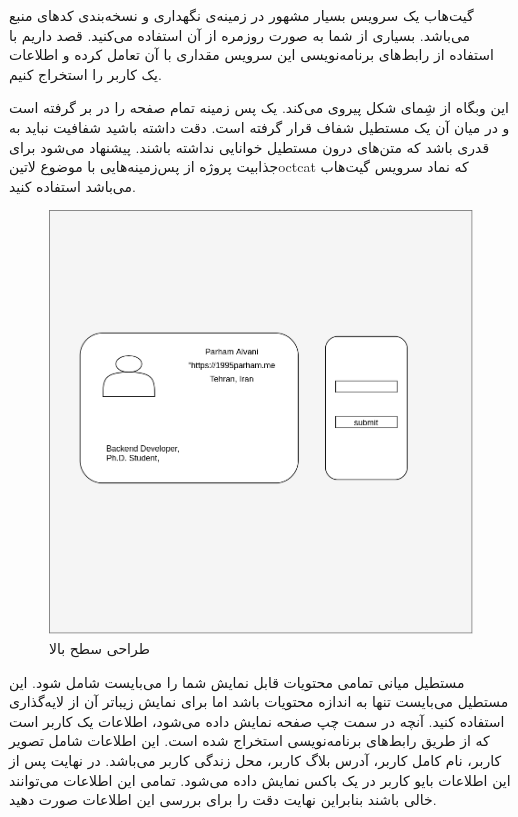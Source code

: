 \documentclass[../main.tex]{subfiles}
\begin{document}

گیت‌هاب یک سرویس بسیار مشهور در زمینه‌ی نگهداری و نسخه‌بندی کدهای منبع می‌باشد. بسیاری از شما به صورت روزمره از آن استفاده می‌کنید.
قصد داریم با استفاده از رابط‌های برنامه‌نویسی این سرویس مقداری با آن تعامل کرده و اطلاعات یک کاربر را استخراج کنیم.

این وبگاه از شِمای شکل  پیروی می‌کند. یک پس زمینه تمام صفحه را در بر گرفته است و در میان آن یک مستطیل شفاف قرار گرفته است.
دقت داشته باشید شفافیت نباید به قدری باشد که متن‌های درون مستطیل خوانایی نداشته باشند.
پیشنهاد می‌شود برای جذابیت پروژه از پس‌زمینه‌هایی با موضوع ‌لاتین{octcat} که نماد سرویس گیت‌هاب می‌باشد استفاده کنید.

\begin{figure}[h]
  \centering
  \includegraphics[scale=0.25]{./github}
  \caption{طراحی سطح بالا}
  \label{fig:high-level-design}
\end{figure}

مستطیل میانی تمامی محتویات قابل نمایش شما را می‌بایست شامل شود. این مستطیل می‌بایست تنها به اندازه محتویات باشد اما برای نمایش زیباتر آن از لایه‌گذاری استفاده کنید.
آنچه در سمت چپ صفحه نمایش داده می‌شود، اطلاعات یک کاربر است که از طریق رابط‌های برنامه‌نویسی استخراج شده است. این اطلاعات شامل تصویر کاربر،
نام کامل کاربر، آدرس بلاگ کاربر، محل زندگی کاربر می‌باشد.
در نهایت پس از این اطلاعات بایو کاربر در یک باکس نمایش داده می‌شود.
تمامی این اطلاعات می‌توانند خالی باشند بنابراین نهایت دقت را برای بررسی این اطلاعات صورت دهید.
\end{document}
